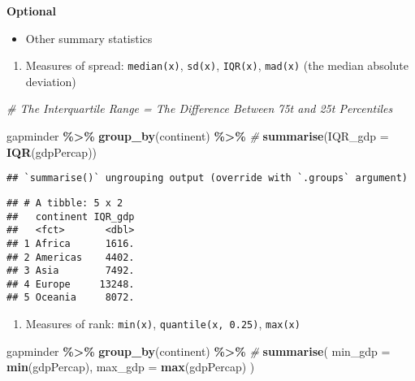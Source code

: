 \documentclass[
]{book}
\newenvironment{Shaded}{\begin{snugshade}}{\end{snugshade}}
\newcommand{\CommentTok}[1]{\textcolor[rgb]{0.56,0.35,0.01}{\textit{#1}}}
\newcommand{\DataTypeTok}[1]{\textcolor[rgb]{0.13,0.29,0.53}{#1}}
\newcommand{\KeywordTok}[1]{\textcolor[rgb]{0.13,0.29,0.53}{\textbf{#1}}}
\newcommand{\NormalTok}[1]{#1}
\newcommand{\OperatorTok}[1]{\textcolor[rgb]{0.81,0.36,0.00}{\textbf{#1}}}
\newcommand{\StringTok}[1]{\textcolor[rgb]{0.31,0.60,0.02}{#1}}
\providecommand{\tightlist}{%
  \setlength{\itemsep}{0pt}\setlength{\parskip}{0pt}}
\begin{document}
\textbf{Optional}

\begin{itemize}
\tightlist
\item
  Other summary statistics
\end{itemize}

\begin{enumerate}
\def\labelenumi{\arabic{enumi}.}
\tightlist
\item
  Measures of spread: \texttt{median(x)}, \texttt{sd(x)}, \texttt{IQR(x)}, \texttt{mad(x)} (the median absolute deviation)
\end{enumerate}

\begin{Shaded}
\begin{Highlighting}[]
\CommentTok{\# The Interquartile Range = The Difference Between 75t and 25t Percentiles}

\NormalTok{gapminder }\OperatorTok{\%\textgreater{}\%}
\StringTok{  }\KeywordTok{group\_by}\NormalTok{(continent) }\OperatorTok{\%\textgreater{}\%}\StringTok{ }\CommentTok{\#}
\StringTok{  }\KeywordTok{summarise}\NormalTok{(}\DataTypeTok{IQR\_gdp =} \KeywordTok{IQR}\NormalTok{(gdpPercap))}
\end{Highlighting}
\end{Shaded}

\begin{verbatim}
## `summarise()` ungrouping output (override with `.groups` argument)
\end{verbatim}

\begin{verbatim}
## # A tibble: 5 x 2
##   continent IQR_gdp
##   <fct>       <dbl>
## 1 Africa      1616.
## 2 Americas    4402.
## 3 Asia        7492.
## 4 Europe     13248.
## 5 Oceania     8072.
\end{verbatim}

\begin{enumerate}
\def\labelenumi{\arabic{enumi}.}
\setcounter{enumi}{1}
\tightlist
\item
  Measures of rank: \texttt{min(x)}, \texttt{quantile(x,\ 0.25)}, \texttt{max(x)}
\end{enumerate}

\begin{Shaded}
\begin{Highlighting}[]
\NormalTok{gapminder }\OperatorTok{\%\textgreater{}\%}
\StringTok{  }\KeywordTok{group\_by}\NormalTok{(continent) }\OperatorTok{\%\textgreater{}\%}\StringTok{ }\CommentTok{\#}
\StringTok{  }\KeywordTok{summarise}\NormalTok{(}
    \DataTypeTok{min\_gdp =} \KeywordTok{min}\NormalTok{(gdpPercap),}
    \DataTypeTok{max\_gdp =} \KeywordTok{max}\NormalTok{(gdpPercap)}
\NormalTok{  )}
\end{Highlighting}
\end{Shaded}
\end{document}
